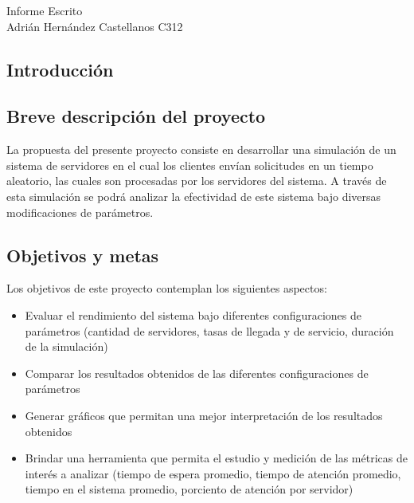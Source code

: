\documentclass[12pt,a4paper]{article}
\author{Laura Martir Beltrán}
\begin{document}
\begin{LARGE}
\begin{center}
Informe Escrito\\
Adrián Hernández Castellanos C312
\end{center}
\end{LARGE}

\begin{flushleft}
\section{Introducción}
\subsection{Breve descripción del proyecto}
La propuesta del presente proyecto consiste en desarrollar una simulación de un sistema de servidores
en el cual los clientes envían solicitudes en un tiempo aleatorio, las cuales son procesadas por
los servidores del sistema. A través de esta simulación se podrá analizar la efectividad de este
sistema bajo diversas modificaciones de parámetros.
\end{flushleft}

\subsection{Objetivos y metas}
Los objetivos de este proyecto contemplan los siguientes aspectos:
\begin{itemize}
\item Evaluar el rendimiento del sistema bajo diferentes configuraciones de parámetros (cantidad de servidores, tasas de llegada y de servicio, duración de la simulación)
\item Comparar los resultados obtenidos de las diferentes configuraciones de parámetros
\item Generar gráficos que permitan una mejor interpretación de los resultados obtenidos
\item Brindar una herramienta que permita el estudio y medición de las métricas de interés a analizar (tiempo de espera promedio, tiempo de atención promedio, tiempo en el sistema promedio, porciento de atención por servidor)
\end{itemize}
\end{document}
